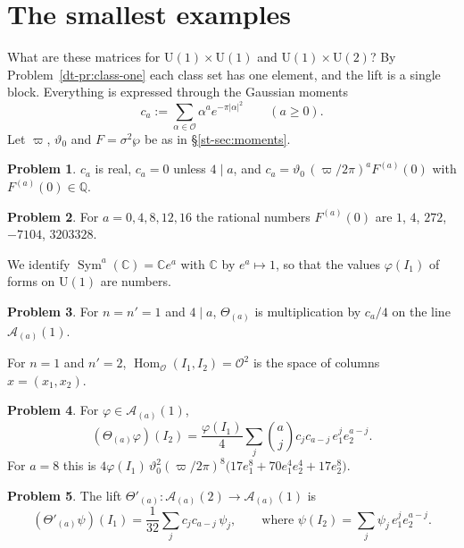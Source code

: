 \documentclass[reqno]{amsart}
\theoremstyle{definition}
\newtheorem{problem}{Problem}[section]
\theoremstyle{plain}
\newcommand{\Q}{\mathbb{Q}}
\newcommand{\C}{\mathbb{C}}
\newcommand{\Oc}{\mathcal{O}}
\newcommand{\Ac}{\mathcal{A}}
\newcommand{\Hom}{\operatorname{Hom}}
\newcommand{\Sym}{\operatorname{Sym}}
\begin{document}
\section{The smallest examples}\label{sec:smallest}

What are these matrices for \(\mathrm{U}(1) \times \mathrm{U}(1)\) and \(\mathrm{U}(1) \times \mathrm{U}(2)\)?  By Problem~\ref{dt-pr:class-one} each class set has one element, and the lift is a single block.  Everything is expressed through the Gaussian moments
\[
  c_a := \sum_{\alpha \in \Oc} \alpha^a e^{-\pi\lvert\alpha\rvert^2} \qquad (a \ge 0) .
\]
Let \(\varpi\), \(\vartheta_0\) and \(F = \sigma^2\wp\) be as in \S\ref{st-sec:moments}.

\begin{problem}\label{pr:ca}
\(c_a\) is real, \(c_a = 0\) unless \(4 \mid a\), and \(c_a = \vartheta_0\, (\varpi/2\pi)^a F^{(a)}(0)\) with \(F^{(a)}(0) \in \Q\).
\end{problem}

\begin{problem}\label{pr:Fa}
For \(a = 0, 4, 8, 12, 16\) the rational numbers \(F^{(a)}(0)\) are \(1\), \(4\), \(272\), \(-7104\), \(3203328\).
\end{problem}

We identify \(\Sym^a(\C) = \C e^a\) with \(\C\) by \(e^a \mapsto 1\), so that the values \(\varphi(I_1)\) of forms on \(\mathrm{U}(1)\) are numbers.

\begin{problem}\label{pr:U1U1}
For \(n = n' = 1\) and \(4 \mid a\), \(\Theta_{(a)}\) is multiplication by \(c_a/4\) on the line \(\Ac_{(a)}(1)\).
\end{problem}

For \(n = 1\) and \(n' = 2\), \(\Hom_\Oc(I_1, I_2) = \Oc^2\) is the space of columns \(x = (x_1, x_2)\).

\begin{problem}\label{pr:U1U2}
For \(\varphi \in \Ac_{(a)}(1)\),
\[
  (\Theta_{(a)}\varphi)(I_2) = \frac{\varphi(I_1)}{4} \sum_{j} \binom{a}{j} c_j c_{a-j}\, e_1^j e_2^{a-j} .
\]
For \(a = 8\) this is \(4\varphi(I_1)\, \vartheta_0^2 (\varpi/2\pi)^8 \bigl(17 e_1^8 + 70 e_1^4 e_2^4 + 17 e_2^8\bigr)\).
\end{problem}

\begin{problem}\label{pr:U2U1}
The lift \(\Theta'_{(a)} \colon \Ac_{(a)}(2) \to \Ac_{(a)}(1)\) is
\[
  (\Theta'_{(a)}\psi)(I_1) = \frac{1}{32} \sum_j c_j c_{a-j}\, \psi_j,
  \qquad \text{where } \psi(I_2) = \sum_j \psi_j\, e_1^j e_2^{a-j} .
\]
\end{problem}
\end{document}
